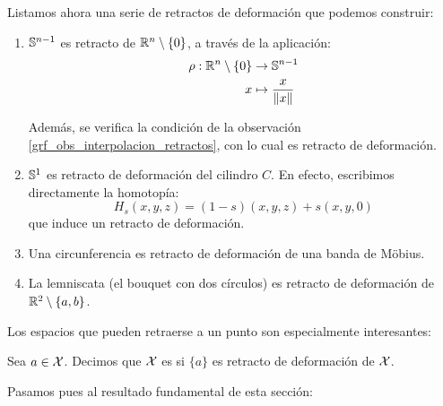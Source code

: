 \begin{exa}
	Listamos ahora una serie de retractos de deformación que podemos construir:
	\begin{enumerate}
		\item $\mathbb{S}^{n-1}$ es retracto de $\mathbb{R}^n\setminus\{0\}$, a través de la aplicación:
		\[\begin{split}
		\rho: \mathbb{R}^n\setminus\{0\} &\to\mathbb{S}^{n-1} \\
		x &\mapsto\frac{x}{\lVert x\rVert}
		\end{split}\]
		
		Además, se verifica la condición de la observación \ref{grf_obs_interpolacion_retractos}, con lo cual es retracto de deformación.
		
		\item $\mathbb{S}^1$ es retracto de deformación del cilindro $C$. En efecto, escribimos directamente la homotopía:
		\[H_s(x,y,z)=(1-s)(x,y,z) + s(x,y,0)\]
		que induce un retracto de deformación.
		
		\item Una circunferencia es retracto de deformación de una banda de Möbius.
		
		\item La lemniscata (el bouquet con dos círculos) es retracto de deformación de $\mathbb{R}^2\setminus\{a,b\}$. \qedhere
	\end{enumerate}
\end{exa}

Los espacios que pueden retraerse a un punto son especialmente interesantes:

\begin{defi}
	Sea $a\in\mathcal{X}$. Decimos que $\mathcal{X}$ es  si $\{a\}$ es retracto de deformación de $\mathcal{X}$.
\end{defi}

Pasamos pues al resultado fundamental de esta sección:


